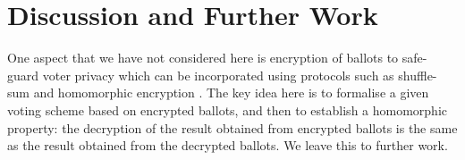 \documentclass{llncs}
\begin{document}
\appendix
\section{Discussion and Further Work}

One aspect that we have not considered here is encryption of
ballots to safe-guard voter privacy which can be incorporated using
protocols such as shuffle-sum \cite{Benaloh:2009:SSC} and
homomorphic encryption \cite{Yi:2014:HEA}. The key idea here is to
formalise a given voting scheme based on encrypted ballots, and then
to establish a homomorphic property: the decryption of the result
obtained from encrypted ballots is the same as the result obtained from
the decrypted ballots.  We leave this to further work.

%
%
\end{document}
